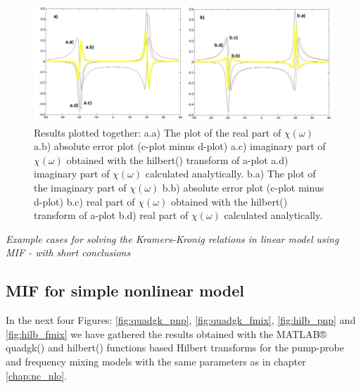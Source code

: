 \documentclass[12pt,twoside,a4paper]{article}
\numberwithin{equation}{subsection}
\numberwithin{figure}{subsection}
\begin{document}
\begin{figure} 
  \includegraphics[width=150mm]{img/hilb_lin.png}
  \caption{Results plotted together: 
   a.a) The plot of the real part of $\chi (\omega )$ 
   a.b) absolute error plot (c-plot minus d-plot) 
   a.c) imaginary part of $\chi (\omega )$ obtained with the hilbert() transform of a-plot 
   a.d) imaginary part of $\chi (\omega )$  calculated analytically. 
   b.a) The plot of the imaginary part of $\chi (\omega )$ 
   b.b) absolute error plot (c-plot minus d-plot) 
   b.c) real part of $\chi (\omega )$ obtained with the hilbert() transform of a-plot 
   b.d) real part of $\chi (\omega )$ calculated analytically. \label{fig:hilb_lin}
  }
\end{figure}

\textit{Example cases for solving the Kramers-Kronig relations in linear model using MIF - with short conclusions}

\subsection{MIF for simple nonlinear model} \label{chap:matlab_nlo}

In the next four Figures: \ref{fig:quadgk_pnp}, \ref{fig:quadgk_fmix}, \ref{fig:hilb_pnp} and \ref{fig:hilb_fmix} we have gathered
the results obtained with the MATLAB® quadgk() and hilbert() functions based Hilbert transforms for the pump-probe and frequency
mixing models with the same parameters as in chapter \ref{chap:nc_nlo}. 
\end{document}
